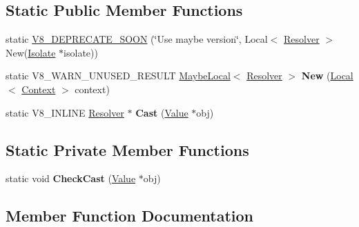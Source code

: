 \subsection*{Static Public Member Functions}
\begin{DoxyCompactItemize}
\item 
static \hyperlink{classv8_1_1_promise_1_1_resolver_a1aa04adcad6243802a3f9819fa840312}{V8\+\_\+\+D\+E\+P\+R\+E\+C\+A\+T\+E\+\_\+\+S\+O\+ON} (\char`\"{}Use maybe version\char`\"{}, Local$<$ \hyperlink{classv8_1_1_promise_1_1_resolver}{Resolver} $>$ New(\hyperlink{classv8_1_1_isolate}{Isolate} $\ast$isolate))
\item 
static V8\+\_\+\+W\+A\+R\+N\+\_\+\+U\+N\+U\+S\+E\+D\+\_\+\+R\+E\+S\+U\+LT \hyperlink{classv8_1_1_maybe_local}{Maybe\+Local}$<$ \hyperlink{classv8_1_1_promise_1_1_resolver}{Resolver} $>$ {\bfseries New} (\hyperlink{classv8_1_1_local}{Local}$<$ \hyperlink{classv8_1_1_context}{Context} $>$ context)\hypertarget{classv8_1_1_promise_1_1_resolver_af2290c10e43fcde230ea7a79b9128b0e}{}\label{classv8_1_1_promise_1_1_resolver_af2290c10e43fcde230ea7a79b9128b0e}

\item 
static V8\+\_\+\+I\+N\+L\+I\+NE \hyperlink{classv8_1_1_promise_1_1_resolver}{Resolver} $\ast$ {\bfseries Cast} (\hyperlink{classv8_1_1_value}{Value} $\ast$obj)\hypertarget{classv8_1_1_promise_1_1_resolver_ab2b541cb210158ed0c757c8b7dc46279}{}\label{classv8_1_1_promise_1_1_resolver_ab2b541cb210158ed0c757c8b7dc46279}

\end{DoxyCompactItemize}
\subsection*{Static Private Member Functions}
\begin{DoxyCompactItemize}
\item 
static void {\bfseries Check\+Cast} (\hyperlink{classv8_1_1_value}{Value} $\ast$obj)\hypertarget{classv8_1_1_promise_1_1_resolver_aa9902d840c9fa7c902a371ad28931118}{}\label{classv8_1_1_promise_1_1_resolver_aa9902d840c9fa7c902a371ad28931118}

\end{DoxyCompactItemize}


\subsection{Member Function Documentation}
